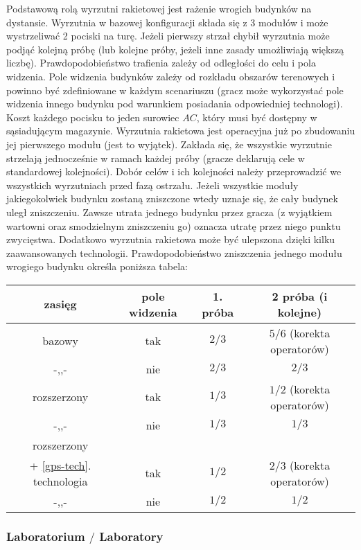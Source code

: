 \documentclass[11pt,a4paper]{article}
\begin{document}
Podstawową rolą wyrzutni rakietowej jest rażenie wrogich budynków na dystansie. Wyrzutnia w bazowej konfiguracji składa się z 3 modułów i może wystrzeliwać 2 pociski na turę. Jeżeli pierwszy strzał chybił wyrzutnia może podjąć kolejną próbę (lub kolejne próby, jeżeli inne zasady umożliwiają większą liczbę). Prawdopodobieństwo trafienia zależy od odległości do celu i pola widzenia. Pole widzenia budynków zależy od rozkładu obszarów terenowych i powinno być zdefiniowane w każdym scenariuszu (gracz może wykorzystać pole widzenia innego budynku pod warunkiem posiadania odpowiedniej technologi). Koszt każdego pocisku to jeden surowiec $AC$, który musi być dostępny w sąsiadującym magazynie. Wyrzutnia rakietowa jest operacyjna już po zbudowaniu jej pierwszego modułu (jest to wyjątek). Zakłada się, że wszystkie wyrzutnie strzelają jednocześnie w ramach każdej próby (gracze deklarują cele w standardowej kolejności). Dobór celów i ich kolejności należy przeprowadzić we wszystkich wyrzutniach przed fazą ostrzału. Jeżeli wszystkie moduły jakiegokolwiek budynku zostaną zniszczone wtedy uznaje się, że cały budynek uległ zniszczeniu. Zawsze utrata jednego budynku przez gracza (z wyjątkiem wartowni oraz smodzielnym zniszczeniu go) oznacza utratę przez niego punktu zwycięstwa. Dodatkowo wyrzutnia rakietowa może być ulepszona dzięki kilku zaawansowanych technologii. Prawdopodobieństwo zniszczenia jednego modułu wrogiego budynku określa poniższa tabela:
\begin{center}
\begin{tabular}{| c | c | c | c |}
  \hline
   \textbf{zasięg} & \textbf{pole widzenia} & \textbf{1. próba} & \textbf{2 próba} (i kolejne) \\
  \hline
  bazowy & tak   & $2/3$ & $5/6$ (korekta operatorów) \\  
  \hline
  -,,- & nie   & $2/3$ & $2/3$ \\  
  \hline
  rozszerzony & tak & $1/3$ & $1/2$ (korekta operatorów) \\  
  \hline
  -,,- & nie  & $1/3$ & $1/3$ \\  
  \hline
  rozszerzony  &  &  &  \\  
  + \ref{gps-tech}. technologia & tak  & $1/2$ & $2/3$ (korekta operatorów) \\  
  \hline
  -,,- & nie   & $1/2$ & $1/2$ \\  
  \hline
\end{tabular}
\end{center}

\subsubsection{Laboratorium $/$ Laboratory}
\end{document}
